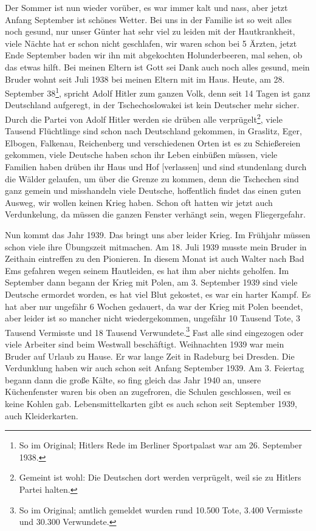 \documentclass[a5paper,11pt,openany]{book}
\newcommand{\seite}[1]{\leavevmode\marginpar{\footnotesize\itshape\raggedright #1}\ignorespaces}
\newcommand{\jahr}[1]{\par\medskip\noindent{\scshape #1}\par\nopagebreak}
\begin{document}
\jahr{Herbst 1938.}
\seite{44}
Der Sommer ist nun wieder vorüber, es war immer kalt und nass, aber jetzt Anfang September ist schönes Wetter.
Bei uns in der Familie ist so weit alles noch gesund, nur unser Günter hat sehr viel zu leiden mit der Hautkrankheit,
  viele Nächte hat er schon nicht geschlafen, wir waren schon bei 5 Ärzten,
  jetzt Ende September baden wir ihn mit abgekochten Holunderbeeren, mal sehen, ob das etwas hilft.
Bei meinen Eltern ist Gott sei Dank auch noch alles gesund, mein Bruder wohnt seit Juli 1938 bei meinen Eltern mit im Haus.
Heute,
\seite{45}
am 28. September 38\footnote{So im Original; Hitlers Rede im Berliner Sportpalast war am 26. September 1938.}, spricht Adolf Hitler zum ganzen Volk, denn seit 14 Tagen ist ganz Deutschland aufgeregt,
  in der Tschechoslowakei ist kein Deutscher mehr sicher.
Durch die Partei von Adolf Hitler werden sie drüben alle verprügelt\footnote{Gemeint ist wohl: Die Deutschen dort werden verprügelt, weil sie zu Hitlers Partei halten.},
  viele Tausend Flüchtlinge sind schon nach Deutschland gekommen,
  in Graslitz, Eger, Elbogen, Falkenau, Reichenberg und verschiedenen Orten ist es zu Schießereien gekommen,
  viele Deutsche haben schon ihr Leben einbüßen müssen,
  viele Familien haben drüben ihr Haus und Hof [verlassen] und sind stundenlang durch die Wälder gelaufen, um über die
\seite{46}
Grenze zu kommen, denn die Tschechen sind ganz gemein und misshandeln viele Deutsche,
  hoffentlich findet das einen guten Ausweg, wir wollen keinen Krieg haben.
Schon oft hatten wir jetzt auch Verdunkelung,
  da müssen die ganzen Fenster verhängt sein, wegen Fliegergefahr.

Nun kommt das Jahr 1939.
Das bringt uns aber leider Krieg.
Im Frühjahr müssen schon viele ihre Übungszeit mitmachen.
Am 18. Juli 1939 musste mein Bruder in Zeithain eintreffen zu den Pionieren.
In diesem Monat
\seite{47}
ist auch Walter nach Bad Ems gefahren wegen seinem Hautleiden,
  es hat ihm aber nichts geholfen.
Im September dann begann der Krieg mit Polen, am 3. September 1939 sind viele Deutsche ermordet worden,
  es hat viel Blut gekostet, es war ein harter Kampf.
Es hat aber nur ungefähr 6 Wochen gedauert, da war der Krieg mit Polen beendet, aber leider ist so mancher nicht wiedergekommen,
  ungefähr 10 Tausend Tote, 3 Tausend Vermisste und 18 Tausend Verwundete.\footnote{So im Original; amtlich gemeldet wurden rund 10.500 Tote, 3.400 Vermisste und 30.300 Verwundete.}
Fast alle sind
\seite{48}
eingezogen oder viele Arbeiter sind beim Westwall beschäftigt.
Weihnachten 1939 war mein Bruder auf Urlaub zu Hause.
Er war lange Zeit in Radeburg bei Dresden.
Die Verdunklung haben wir auch schon seit Anfang September 1939.
Am 3. Feiertag begann dann die große Kälte,
  so fing gleich das Jahr 1940 an, unsere Küchenfenster waren bis oben an zugefroren,
  die Schulen geschlossen, weil es keine Kohlen gab.
Lebensmittelkarten gibt es auch schon seit September 1939, auch Kleiderkarten.
\end{document}
